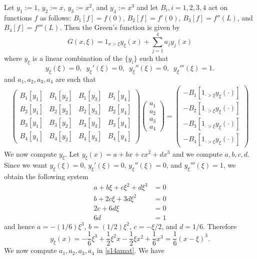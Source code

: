 Let $y_{1} := 1$, $y_{2} := x$, $y_{3} := x^{2}$, and $y_{4} := x^{3}$ and let $B_{i}, i = 1, 2, 3, 4$ act on functions $f$ as follows:
$B_{1}[f] = f(0)$, $B_{2}[f] = f'(0)$, $B_{3}[f] = f''(L)$, and $B_{4}[f] = f'''(L)$. Then the Green's function is given by
$$G(x, \xi) = 1_{x > \xi}y_{\xi}(x) + \sum_{j = 1}^{4}a_{j}y_{j}(x)$$
where $y_{\xi}$ is a linear combination of the $\{y_{i}\}$ such that
$$y_{\xi}(\xi) = 0, \,\,\, y_{\xi}'(\xi) = 0, \,\,\, y_{\xi}''(\xi) = 0, \,\,\,y_{\xi}'''(\xi) = 1.$$
and $a_{1}, a_{2}, a_{3}, a_{4}$ are such that
\begin{align}\label{s14amat}
\begin{pmatrix}
B_{1}[y_1] & B_{1}[y_2] & B_{1}[y_3] & B_{1}[y_4]\\
B_{2}[y_1] & B_{2}[y_2] & B_{2}[y_3] & B_{2}[y_4]\\
B_{3}[y_1] & B_{3}[y_2] & B_{3}[y_3] & B_{3}[y_4]\\
B_{4}[y_1] & B_{4}[y_2] & B_{4}[y_3] & B_{4}[y_4]
\end{pmatrix}
\begin{pmatrix}
a_1\\ a_2 \\ a_3\\ a_4
\end{pmatrix}
=
\begin{pmatrix}
-B_{1}[1_{\cdot > \xi}y_{\xi}(\cdot)]\\
-B_{2}[1_{\cdot > \xi}y_{\xi}(\cdot)]\\
-B_{3}[1_{\cdot > \xi}y_{\xi}(\cdot)]\\
-B_{4}[1_{\cdot > \xi}y_{\xi}(\cdot)]
\end{pmatrix}
\end{align}
We now compute $y_{\xi}$. Let $y_{\xi}(x) = a + bx + cx^{2} + dx^{3}$ and we compute $a, b, c, d$.
Since we want $y_{\xi}(\xi) = 0$, $y_{\xi}'(\xi) = 0$, $y_{\xi}''(\xi) = 0$, and $y_{\xi}'''(\xi) = 1$,
we obtain the following system
\begin{align*}
a + b\xi + c\xi^{2} + d\xi^{3} & = 0\\
b + 2c\xi + 3d\xi^{2} & = 0\\
2c + 6d\xi &= 0\\
6d & = 1
\end{align*}
and hence $a = -(1/6)\xi^{3}$, $b = (1/2)\xi^{2}$, $c = -\xi/2$, and $d = 1/6$.
Therefore
$$y_{\xi}(x) = -\frac{1}{6}\xi^{3} + \frac{1}{2}\xi^{2}x - \frac{1}{2}\xi x^{2} + \frac{1}{6}x^{3} = \frac{1}{6}(x- \xi)^{3}.$$
We now compute $a_{1}, a_{2}, a_{3}, a_{4}$ in \eqref{s14amat}.
We have
